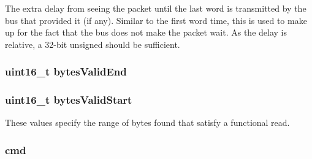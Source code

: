 \label{classPacket_a7bf8ae0a056329f751eda8b39ca4c268}
The extra delay from seeing the packet until the last word is transmitted by the bus that provided it (if any). Similar to the first word time, this is used to make up for the fact that the bus does not make the packet wait. As the delay is relative, a 32-\/bit unsigned should be sufficient. \hypertarget{classPacket_ae0d66052bfed50bce9fd141f1728b755}{
\subsubsection[{bytesValidEnd}]{\setlength{\rightskip}{0pt plus 5cm}uint16\_\-t {\bf bytesValidEnd}}}
\label{classPacket_ae0d66052bfed50bce9fd141f1728b755}
\hypertarget{classPacket_a5a3c6bfd022f6812ff7f168c5233ad23}{
\subsubsection[{bytesValidStart}]{\setlength{\rightskip}{0pt plus 5cm}uint16\_\-t {\bf bytesValidStart}}}
\label{classPacket_a5a3c6bfd022f6812ff7f168c5233ad23}
These values specify the range of bytes found that satisfy a functional read. \hypertarget{classPacket_af88eb56d484b750933cd2ea86594f001}{
\subsubsection[{cmd}]{ {\bf cmd}}}
\label{classPacket_af88eb56d484b750933cd2ea86594f001}


